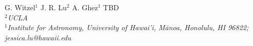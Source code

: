 G. Witzel${}^1$
J. R. Lu${}^2$
A. Ghez${}^1$
TBD
\\
${}^2${\em UCLA}
\\
${}^1${\em Institute for Astronomy, University of Hawai'i, M\={a}noa,
    Honolulu, HI 96822; jessica.lu@hawaii.edu}
\\
